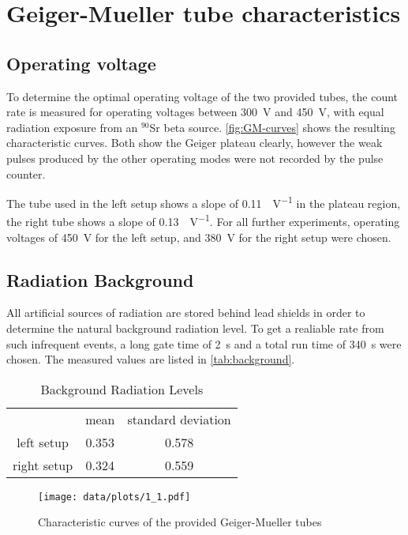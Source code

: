 \chapter{Geiger-Mueller tube characteristics}
\section{Operating voltage}
To determine the optimal operating voltage of the two provided tubes, the count rate is measured for operating voltages between \SI{300}{\volt} and \SI{450}{\volt}, with equal radiation exposure from an $^{90}$Sr beta source.
\autoref{fig:GM-curves} shows the resulting characteristic curves.
Both show the Geiger plateau clearly, however the weak pulses produced by the other operating modes were not recorded by the pulse counter.

The tube used in the left setup shows a slope of \SI{0.11}{\cps\per\volt} in the plateau region, the right tube shows a slope of \SI{0.13}{\cps\per\volt}.
For all further experiments, operating voltages of \SI{450}{\volt} for the left setup, and \SI{380}{\volt} for the right setup were chosen.

\section{Radiation Background}
All artificial sources of radiation are stored behind lead shields in order to determine the natural background radiation level.
To get a realiable rate from such infrequent events, a long gate time of \SI{2}{\second} and a total run time of \SI{340}{\second} were chosen.
The measured values are listed in \autoref{tab:background}.

\begin{table}[b!]\centering
	\caption{Background Radiation Levels}
	\label{tab:background}
	\begin{tabular}{ccc}
		&	mean& standard deviation\\
		left setup&	\SI{0.353}{\cps}&	\SI{0.578}{\cps}\\
		right setup&	\SI{0.324}{\cps}&	\SI{0.559}{\cps}\\
	\end{tabular}
\end{table}

\begin{figure}[b!]
	\centering
	\texttt{[image: data/plots/1\_1.pdf]}
	\caption{Characteristic curves of the provided Geiger-Mueller tubes}
	\label{fig:GM-curves}
\end{figure}

